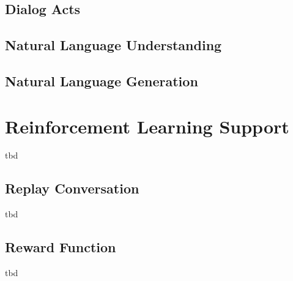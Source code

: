 \subsection{Dialog Acts}
\subsection{Natural Language Understanding}
\subsection{Natural Language Generation}


\section{Reinforcement Learning Support}
tbd
\subsection{Replay Conversation}
tbd
\subsection{Reward Function}
tbd

